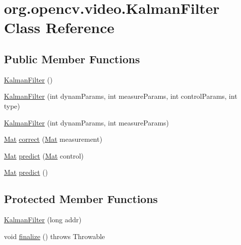 \hypertarget{classorg_1_1opencv_1_1video_1_1_kalman_filter}{}\section{org.\+opencv.\+video.\+Kalman\+Filter Class Reference}
\label{classorg_1_1opencv_1_1video_1_1_kalman_filter}
\subsection*{Public Member Functions}
\begin{DoxyCompactItemize}
\item 
\mbox{\hyperlink{classorg_1_1opencv_1_1video_1_1_kalman_filter_a49a321fdcc081e6f68aceb24b8397111}{Kalman\+Filter}} ()
\item 
\mbox{\hyperlink{classorg_1_1opencv_1_1video_1_1_kalman_filter_a924d7dd0b8d06dd45b8987425a28b365}{Kalman\+Filter}} (int dynam\+Params, int measure\+Params, int control\+Params, int type)
\item 
\mbox{\hyperlink{classorg_1_1opencv_1_1video_1_1_kalman_filter_af518121ee4593481d3642c3163443eaf}{Kalman\+Filter}} (int dynam\+Params, int measure\+Params)
\item 
\mbox{\hyperlink{classorg_1_1opencv_1_1core_1_1_mat}{Mat}} \mbox{\hyperlink{classorg_1_1opencv_1_1video_1_1_kalman_filter_a7c610a98cf5e5aae5d9600b99a476127}{correct}} (\mbox{\hyperlink{classorg_1_1opencv_1_1core_1_1_mat}{Mat}} measurement)
\item 
\mbox{\hyperlink{classorg_1_1opencv_1_1core_1_1_mat}{Mat}} \mbox{\hyperlink{classorg_1_1opencv_1_1video_1_1_kalman_filter_a0a93554e79d5b33f3747247fde5d25f8}{predict}} (\mbox{\hyperlink{classorg_1_1opencv_1_1core_1_1_mat}{Mat}} control)
\item 
\mbox{\hyperlink{classorg_1_1opencv_1_1core_1_1_mat}{Mat}} \mbox{\hyperlink{classorg_1_1opencv_1_1video_1_1_kalman_filter_ab79a85e63d61abc81fba2e121104ddc9}{predict}} ()
\end{DoxyCompactItemize}
\subsection*{Protected Member Functions}
\begin{DoxyCompactItemize}
\item 
\mbox{\hyperlink{classorg_1_1opencv_1_1video_1_1_kalman_filter_a81505b4a99d47a000f0a6e8000d8307f}{Kalman\+Filter}} (long addr)
\item 
void \mbox{\hyperlink{classorg_1_1opencv_1_1video_1_1_kalman_filter_a89fc46ce23e571ad964c3db45baeadc6}{finalize}} ()  throws Throwable 
\end{DoxyCompactItemize}
